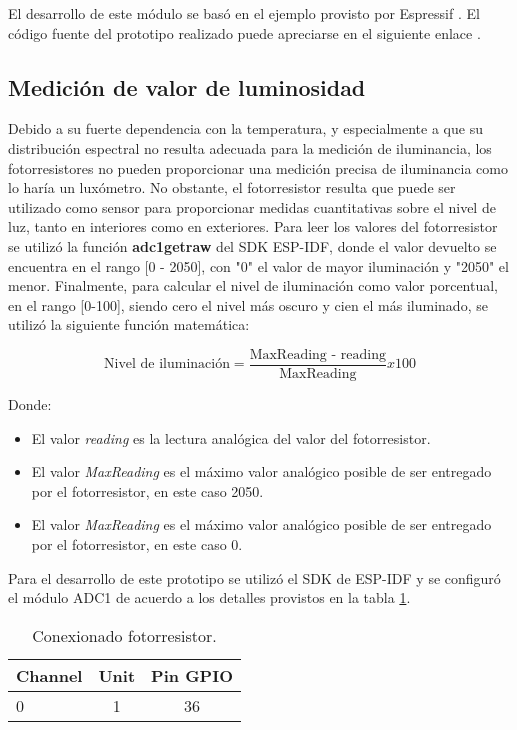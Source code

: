 El desarrollo de este módulo se basó en el ejemplo provisto por Espressif \cite{ESP32_ADC1_Example}. El código fuente del prototipo realizado puede apreciarse en el siguiente enlace \cite{ESP32_POC_joystick}.


\subsection{Medición de valor de luminosidad}
Debido a su fuerte dependencia con la temperatura, y especialmente a que su distribución espectral no resulta adecuada para la medición de iluminancia, los fotorresistores no pueden proporcionar una medición precisa de iluminancia como lo haría un luxómetro. No obstante, el fotorresistor resulta que puede ser utilizado como sensor para proporcionar medidas cuantitativas sobre el nivel de luz, tanto en interiores como en exteriores.
Para leer los valores del fotorresistor se utilizó la función \textbf{adc1\textunderscore get\textunderscore raw } del SDK ESP-IDF, donde el valor devuelto se encuentra en el rango [0 - 2050], con "0" el valor de mayor iluminación y "2050" el menor.
Finalmente, para calcular el nivel de iluminación como valor porcentual, en el rango [0-100], siendo cero el nivel más oscuro y cien el más iluminado, se utilizó la siguiente función matemática:

\begin{equation*}
\mbox{Nivel de iluminación}=\frac{\mbox{MaxReading - reading}}{\mbox{MaxReading}} x 100
\end{equation*}

Donde:
\begin{itemize}
	\item El valor \textit{reading} es la lectura analógica del valor del fotorresistor.
	\item El valor \textit{MaxReading} es el máximo valor analógico posible de ser entregado por el fotorresistor, en este caso 2050.
	\item El valor \textit{MaxReading} es el máximo valor analógico posible de ser entregado por el fotorresistor, en este caso 0.
\end{itemize}

Para el desarrollo de este prototipo se utilizó el SDK de ESP-IDF y se configuró el módulo ADC1 de acuerdo a los detalles provistos en la tabla \ref{tab:conexionado_fotoresistor}.

\vspace{0.5cm}
\begin{table}[h]
\centering
\caption[Conexionado fotoresistor]{Conexionado fotorresistor.}
\begin{tabular}{l c c}
\toprule
\textbf{Channel} & \textbf{Unit} & \textbf{Pin GPIO}\\
\midrule
0 & 1 & 36 \\
\bottomrule
\hline
\end{tabular}
\label{tab:conexionado_fotoresistor}
\end{table}


